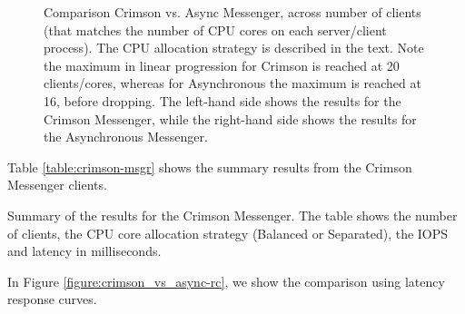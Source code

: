 \begin{figure}[!ht]
\begin{minipage}{.5\textwidth}
  \end{minipage}%
  \caption{Comparison Crimson vs. Async Messenger, across number of clients
  (that matches the number of CPU cores on each server/client process). The CPU
  allocation strategy is described in the text. Note the maximum in linear
  progression for Crimson is reached at 20 clients/cores, whereas for
  Asynchronous the maximum is reached at 16, before dropping. The left-hand
  side shows the results for the Crimson Messenger, while the right-hand side
  shows the results for the Asynchronous Messenger.}
  \label{figure:crimson_vs_async}
\end{figure}

Table \ref{table:crimson-msgr} shows the summary results from the Crimson Messenger clients.
\begin{table}[!h]
\centering
{\small

}
\label{table:crimson-msgr}
\caption{Summary of the results for the Crimson Messenger. The table shows the
  number of clients, the CPU core allocation strategy (Balanced or Separated),
  the IOPS and latency in milliseconds.}
\end{table}

In Figure \ref{figure:crimson_vs_async-rc}, we show the comparison using latency response curves.

